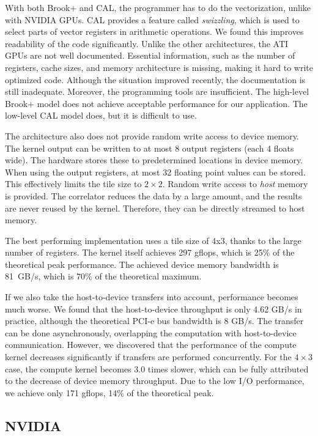 \documentclass{article}
\begin{document}
With both Brook+ and CAL, the programmer has to do the vectorization,
unlike with NVIDIA GPUs.  CAL provides a feature called
\emph{swizzling}, which is used to select parts of vector registers in
arithmetic operations.  We found this improves readability of the code
significantly.  Unlike the other architectures, the ATI GPUs are not
well documented.  Essential information, such as the number of
registers, cache sizes, and memory architecture is missing, making it
hard to write optimized code. Although the situation improved
recently, the documentation is still inadequate.  Moreover, the
programming tools are insufficient. The high-level Brook+ model does
not achieve acceptable performance for our application. The low-level
CAL model does, but it is difficult to use.

The architecture also does not provide random write access to device
memory. The kernel output can be written to at most 8 output registers
(each 4 floats wide). The hardware stores these to predetermined
locations in device memory.  When using the output registers, at most
32 floating point values can be stored.  This effectively limits the
tile size to $2\times2$.  Random write access to \emph{host} memory is
provided.  The correlator reduces the data by a large amount, and the
results are never reused by the kernel. Therefore, they can be
directly streamed to host memory.

The best performing implementation uses a tile size of 4x3, thanks to
the large number of registers.  The kernel itself achieves 297 gflops,
which is 25\% of the theoretical peak performance. The achieved device
memory bandwidth is 81~GB/s, which is 70\% of the theoretical maximum.

If we also take the host-to-device transfers into account, performance
becomes much worse.  We found that the host-to-device throughput is
only 4.62 GB/s in practice, although the theoretical PCI-e bus
bandwidth is 8 GB/s.  The transfer can be done asynchronously,
overlapping the computation with host-to-device communication.
However, we discovered that the performance of the compute kernel
decreases significantly if transfers are performed concurrently. For
the $4\times3$ case, the compute kernel becomes 3.0 times slower,
which can be fully attributed to the decrease of device memory
throughput.  Due to the low I/O performance, we achieve only 171
gflops, 14\% of the theoretical peak.


\subsection{NVIDIA}
\end{document}
